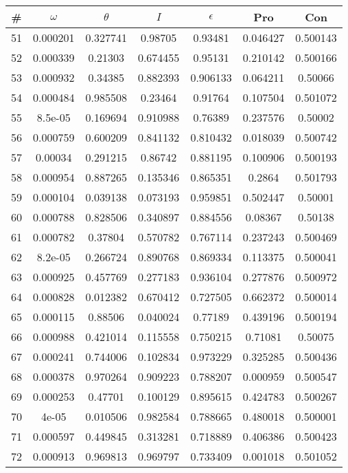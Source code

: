 \newpage
\begin{table}
\begin{tabular}{c|c|c|c|c|c|c}
\# & $\omega$ & $\theta$ & $I$ & $\epsilon$ & Pro & Con\\
\hline
51 & 0.000201 & 0.327741 & 0.98705 & 0.93481 & 0.046427 & 0.500143\\
52 & 0.000339 & 0.21303 & 0.674455 & 0.95131 & 0.210142 & 0.500166\\
53 & 0.000932 & 0.34385 & 0.882393 & 0.906133 & 0.064211 & 0.50066\\
54 & 0.000484 & 0.985508 & 0.23464 & 0.91764 & 0.107504 & 0.501072\\
55 & 8.5e-05 & 0.169694 & 0.910988 & 0.76389 & 0.237576 & 0.50002\\
56 & 0.000759 & 0.600209 & 0.841132 & 0.810432 & 0.018039 & 0.500742\\
57 & 0.00034 & 0.291215 & 0.86742 & 0.881195 & 0.100906 & 0.500193\\
58 & 0.000954 & 0.887265 & 0.135346 & 0.865351 & 0.2864 & 0.501793\\
59 & 0.000104 & 0.039138 & 0.073193 & 0.959851 & 0.502447 & 0.50001\\
60 & 0.000788 & 0.828506 & 0.340897 & 0.884556 & 0.08367 & 0.50138\\
61 & 0.000782 & 0.37804 & 0.570782 & 0.767114 & 0.237243 & 0.500469\\
62 & 8.2e-05 & 0.266724 & 0.890768 & 0.869334 & 0.113375 & 0.500041\\
63 & 0.000925 & 0.457769 & 0.277183 & 0.936104 & 0.277876 & 0.500972\\
64 & 0.000828 & 0.012382 & 0.670412 & 0.727505 & 0.662372 & 0.500014\\
65 & 0.000115 & 0.88506 & 0.040024 & 0.77189 & 0.439196 & 0.500194\\
66 & 0.000988 & 0.421014 & 0.115558 & 0.750215 & 0.71081 & 0.50075\\
67 & 0.000241 & 0.744006 & 0.102834 & 0.973229 & 0.325285 & 0.500436\\
68 & 0.000378 & 0.970264 & 0.909223 & 0.788207 & 0.000959 & 0.500547\\
69 & 0.000253 & 0.47701 & 0.100129 & 0.895615 & 0.424783 & 0.500267\\
70 & 4e-05 & 0.010506 & 0.982584 & 0.788665 & 0.480018 & 0.500001\\
71 & 0.000597 & 0.449845 & 0.313281 & 0.718889 & 0.406386 & 0.500423\\
72 & 0.000913 & 0.969813 & 0.969797 & 0.733409 & 0.001018 & 0.501052\\

\end{tabular}
\end{table}
